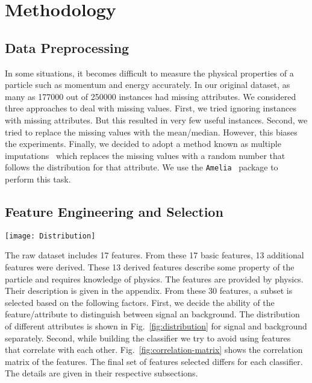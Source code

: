 \section{Methodology}
\label{sec:methodology}


\subsection{Data Preprocessing}
In some situations, it becomes difficult to measure the physical properties of a particle such as momentum and energy accurately. In our original dataset, as many as 177000 out of 250000 instances had missing attributes. We considered three approaches to deal with missing values. First, we tried ignoring instances with missing attributes. But this resulted in very few useful instances. Second, we tried to replace the missing values with the mean/median. However, this biases the experiments. Finally, we decided to adopt a method known as multiple imputations~\cite{MultipleImputation} which replaces the missing values with a random number that follows the distribution for that attribute. We use the \texttt{Amelia}~\cite{Amelia} package to perform this task.



\subsection{Feature Engineering and Selection}

\begin{figure*}[t]
\centering
\texttt{[image: Distribution]}
\caption{Distribution of different attributes for signal. Blue represents signal and red represents background.}
\label{fig:distribution}
\end{figure*}

The raw dataset includes 17 features. From these 17 basic features, 13 additional features were derived. These 13 derived features describe some property of the particle and requires knowledge of physics. The features are provided by physics. Their description is given in the appendix. From these 30 features, a subset is selected based on the following factors. First, we decide the ability of the feature/attribute to distinguish between signal an background. The distribution of different attributes is shown in Fig.~\ref{fig:distribution} for signal and background separately. Second, while building the classifier we try to avoid using features that correlate with each other. Fig.~\ref{fig:correlation-matrix} shows the correlation matrix of the features. The final set of features selected differs for each classifier. The details are given in their respective subsections.

